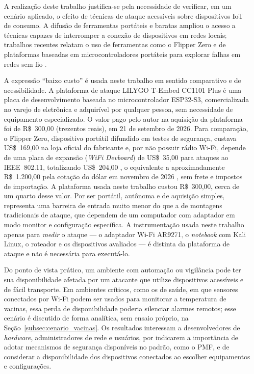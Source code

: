 A realização deste trabalho justifica-se pela necessidade de verificar, em um cenário aplicado, o efeito de técnicas de ataque acessíveis sobre dispositivos IoT de consumo. A difusão de ferramentas portáteis e baratas ampliou o acesso a técnicas capazes de interromper a conexão de dispositivos em redes locais; trabalhos recentes relatam o uso de ferramentas como o Flipper Zero e de plataformas baseadas em microcontroladores portáteis para explorar falhas em redes sem fio \cite{James2023,LitayemAlsadi2023}.

A expressão ``baixo custo'' é usada neste trabalho em sentido comparativo e de acessibilidade. A plataforma de ataque LILYGO T-Embed CC1101 Plus é uma placa de desenvolvimento baseada no microcontrolador ESP32-S3, comercializada no varejo de eletrônica e adquirível por qualquer pessoa, sem necessidade de equipamento especializado. O valor pago pelo autor na aquisição da plataforma foi de R\$~300,00 (trezentos reais), em 21 de setembro de 2026. Para comparação, o Flipper Zero, dispositivo portátil difundido em testes de segurança, custava US\$~169,00 na loja oficial do fabricante e, por não possuir rádio Wi-Fi, depende de uma placa de expansão (\textit{WiFi Devboard}) de US\$~35,00 para ataques ao IEEE~802.11, totalizando US\$~204,00 \cite{FlipperLoja}, o equivalente a aproximadamente R\$~1.200,00 pela cotação do dólar em novembro de 2026 \cite{BCBPtax2026}, sem frete e impostos de importação. A plataforma usada neste trabalho custou R\$~300,00, cerca de um quarto desse valor. Por ser portátil, autônoma e de aquisição simples, representa uma barreira de entrada muito menor do que a de montagens tradicionais de ataque, que dependem de um computador com adaptador em modo monitor e configuração específica. A instrumentação usada neste trabalho apenas para \emph{medir} o ataque --- o adaptador Wi-Fi AR9271, o \textit{notebook} com Kali Linux, o roteador e os dispositivos avaliados --- é distinta da plataforma de ataque e não é necessária para executá-lo.

Do ponto de vista prático, um ambiente com automação ou vigilância pode ter sua disponibilidade afetada por um atacante que utilize dispositivos acessíveis e de fácil transporte. Em ambientes críticos, como os de saúde, em que sensores conectados por Wi-Fi podem ser usados para monitorar a temperatura de vacinas, essa perda de disponibilidade poderia silenciar alarmes remotos; esse cenário é discutido de forma analítica, sem ensaio próprio, na Seção~\ref{subsec:cenario_vacinas}. Os resultados interessam a desenvolvedores de \textit{hardware}, administradores de rede e usuários, por indicarem a importância de adotar mecanismos de segurança disponíveis no padrão, como o PMF, e de considerar a disponibilidade dos dispositivos conectados ao escolher equipamentos e configurações.

